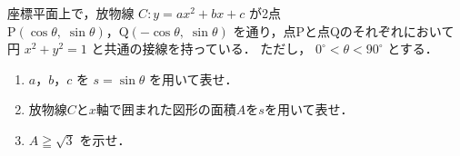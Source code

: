 ﻿\documentclass[../../../uem_tok_q.tex]{subfiles}
\begin{document}
    座標平面上で，放物線 $C\colon y=ax^2+bx+c$ が2点\\
    $\mathrm{P}(\cos\theta,\;\sin\theta)$，$\mathrm{Q}(-\cos\theta,\;\sin\theta)$%
    を通り，点Pと点Qのそれぞれにおいて円 $x^2+y^2=1$ と共通の接線を持っている．%
    ただし， $0^\circ<\theta<90^\circ$ とする．

    \begin{enumerate}
        \item $a$，$b$，$c$ を $s=\sin\theta$ を用いて表せ．
        \item 放物線$C$と$x$軸で囲まれた図形の面積$A$を$s$を用いて表せ．
        \item $A\geqq\sqrt{3}$ を示せ．
    \end{enumerate}
\end{document}
